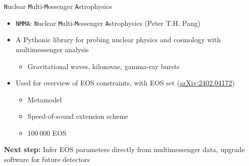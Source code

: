 \documentclass[usenames,dvipsnames,t]{beamer}
\begin{document}
\begin{frame}{\texttt{N}uclear \texttt{M}ulti-\texttt{M}essenger \texttt{A}strophysics}

  \def\x{7mm}
  \def\y{3mm}
  
  \begin{itemize}
    \item \texttt{NMMA}: \texttt{N}uclear \texttt{M}ulti-\texttt{M}essenger \texttt{A}strophysics (Peter T.H. Pang) 
    
    \vspace{\x}

    \item A Pythonic library for probing nuclear physics and cosmology with multimessenger analysis
    \begin{itemize}
      \item Gravitational waves, kilonovae, gamma-ray bursts
    \end{itemize}
    
    \pause
    \vspace{\x}

    \item Used for overview of EOS constraints, with  EOS set (\href{https://arxiv.org/abs/2402.04172}{arXiv:2402.04172})
    \begin{itemize}
      \item Metamodel
      \item Speed-of-sound extension scheme
      \item $100 \ 000$ EOS
    \end{itemize}
  \end{itemize}

  \vspace{\y}
  \pause

  \begin{tcolorbox}[colback=blue!10, boxrule=0pt]
    \textbf{Next step:} Infer EOS parameters directly from multimessenger data, upgrade software for future detectors
  \end{tcolorbox}
  
  \end{frame}


\end{document}
